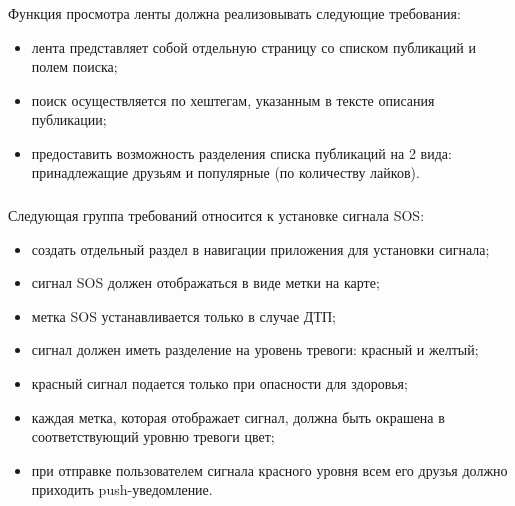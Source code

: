 \subsubsection{}
\label{sec:domain:specification:student_history}

Функция просмотра ленты должна реализовывать следующие требования:
\begin{itemize}
	\item лента представляет собой отдельную страницу со списком публикаций и полем поиска;
	\item поиск осуществляется по хештегам, указанным в тексте описания публикации;
	\item предоставить возможность разделения списка публикаций на 2 вида: принадлежащие друзьям и популярные (по количеству лайков).
\end{itemize}

\subsubsection{}
\label{sec:domain:specification:student_history}

Следующая группа требований относится к установке сигнала SOS:
\begin{itemize}
	\item создать отдельный раздел в навигации приложения для установки сигнала;
	\item сигнал SOS должен отображаться в виде метки на карте;
	
	\item метка SOS устанавливается только в случае ДТП;
	
	\item сигнал должен иметь разделение на уровень тревоги: красный и желтый;
	\item красный сигнал подается только при опасности для здоровья;
	\item каждая метка, которая отображает сигнал, должна быть окрашена в соответствующий уровню тревоги цвет;
	\item при отправке пользователем сигнала красного уровня всем его друзья должно приходить push-уведомление.
\end{itemize}

\subsubsection{}
\label{sec:domain:specification:student_history}

